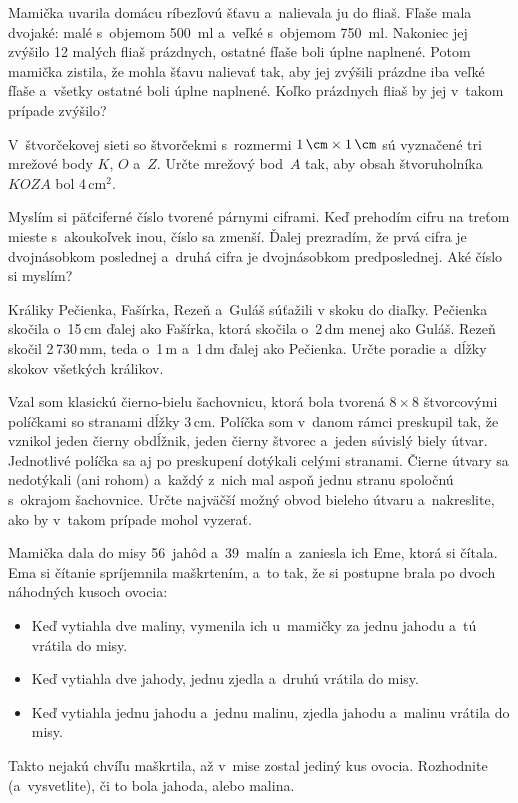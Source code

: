{%
Mamička uvarila domácu ríbezľovú šťavu a~nalievala ju do fliaš.
Fľaše mala dvojaké: malé s~objemom 500~ml a~veľké s~objemom 750~ml.
Nakoniec jej zvýšilo 12 malých fliaš prázdnych, ostatné fľaše boli úplne naplnené.
Potom mamička zistila, že mohla šťavu nalievať tak, aby jej zvýšili prázdne iba veľké fľaše a~všetky ostatné boli úplne naplnené.
Koľko prázdnych fliaš by jej v~takom prípade zvýšilo?
}

{%
V~štvorčekovej sieti so štvorčekmi s~rozmermi $1\,\cm\times1\,\cm$ sú vyznačené tri mrežové body $K$, $O$ a~$Z$.
Určte mrežový bod~$A$ tak, aby obsah štvoruholníka $KOZA$ bol 4\,cm$^2$.
%
}

{%
Myslím si päťciferné číslo tvorené párnymi ciframi.
Keď prehodím cifru na treťom mieste s~akoukoľvek inou, číslo sa zmenší.
Ďalej prezradím, že prvá cifra je dvojnásobkom poslednej a~druhá cifra je dvojnásobkom predposlednej.
Aké číslo si myslím?
}

{%
Králiky Pečienka, Fašírka, Rezeň a~Guláš súťažili v skoku do diaľky.
Pečienka skočila o~15\,cm ďalej ako Fašírka, ktorá skočila o~2\,dm menej ako Guláš.
Rezeň skočil 2\,730\,mm, teda o~1\,m a~1\,dm ďalej ako Pečienka.
Určte poradie a~dĺžky skokov všetkých králikov.
}

{%
Vzal som klasickú čierno-bielu šachovnicu, ktorá bola tvorená $8\times8$ štvorcovými políčkami so stranami dĺžky 3\,cm.
Políčka som v~danom rámci preskupil tak, že vznikol jeden čierny obdĺžnik, jeden čierny štvorec a~jeden súvislý biely útvar.
Jednotlivé políčka sa aj po preskupení dotýkali celými stranami.
Čierne útvary sa nedotýkali (ani rohom) a~každý z~nich mal aspoň jednu stranu spoločnú s~okrajom šachovnice.
Určte najväčší možný obvod bieleho útvaru a~nakreslite, ako by v~takom prípade mohol vyzerať.
}

{%
Mamička dala do misy 56~jahôd a~39~malín a~zaniesla ich Eme, ktorá si čítala.
Ema si čítanie spríjemnila maškrtením, a~to tak, že si postupne brala po dvoch náhodných kusoch ovocia:
\begin{itemize}
\item Keď vytiahla dve maliny, vymenila ich u~mamičky za jednu jahodu a~tú vrátila do misy.
\item Keď vytiahla dve jahody, jednu zjedla a~druhú vrátila do misy.
\item Keď vytiahla jednu jahodu a~jednu malinu, zjedla jahodu a~malinu vrátila do misy.
\end{itemize}
Takto nejakú chvíľu maškrtila, až v~mise zostal jediný kus ovocia.
Rozhodnite (a~vysvetlite), či to bola jahoda, alebo malina.
}

